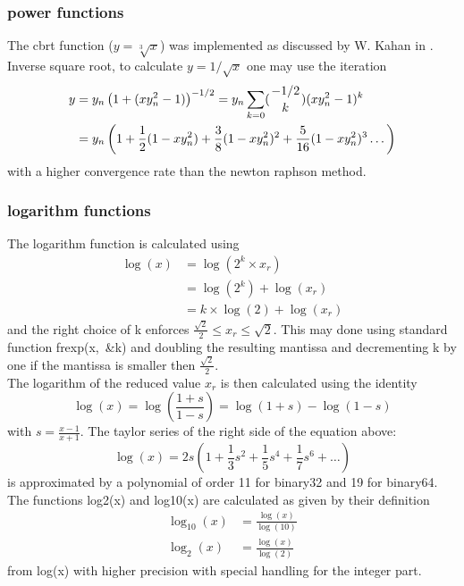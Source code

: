 \documentclass[10pt,a4paper,final,oneside]{article}
\numberwithin{equation}{subsection}
\begin{document}
%
%
\subsubsection{power functions}

The cbrt function ($ y=\sqrt[3]{x} $) was implemented as discussed by
W. Kahan in \cite{Kahan1991}.\\[10pt]
%
Inverse square root, to calculate $ y = 1/\sqrt{x} $ one may use the
iteration
\begin{equation}
    \begin{aligned}
        y &= y_n \left( 1+ ( x y_n^2 -1) \right)^{-1/2}
            = y_n \sum_{k=0} ({{-1/2}\atop{k}}) (x y_n^2 -1)^k \\
            & = y_n \left( 1 + \frac{1}{2} (1 - x y_n^2 ) +
            \frac{3}{8}(1- x y_n^2)^2 +
            \frac{5}{16} (1-x y_n^2)^3 \dots
            \right)
    \end{aligned}
\end{equation}
with a higher convergence rate than the newton raphson method.\\[10pt]
\subsubsection{logarithm functions}
%
The logarithm function is calculated using
\begin{equation}
    \begin{aligned}
        \log(x) &= \log(2^k \times x_r)  \\
                &= \log(2^k) + \log(x_r)  \\
                &= k \times \log(2) + \log(x_r)
  \end{aligned}
\end{equation}
and the right choice of k enforces
$ \frac{\sqrt{2}}{2} \le x_r \le \sqrt{2} $.
This may done using standard function \mbox{frexp(x, \&k)} and doubling
the resulting mantissa and decrementing k by one if the mantissa is
smaller then $\frac{\sqrt{2}}{2}$.\\[10pt]
%
The logarithm of the reduced value $x_r$ is then calculated using the
identity
\begin{equation}
  \log(x) = \log \left( \frac{1+s}{1-s} \right) = \log(1+s) - \log(1-s)
\end{equation}
with $  s= \frac{x-1}{x+1} $.
The taylor series of the right side of the equation above:
\begin{displaymath}
\log(x) = 2s
\left( 1 + \frac{1}{3} s^2 + \frac{1}{5} s^4 + \frac{1}{7} s^6 + \dots  \right)
\end{displaymath}
is approximated by a polynomial of order 11 for binary32 and 19 for binary64.
%
The functions log2(x) and log10(x) are calculated as given by their definition
\[
    \begin{aligned}
        \log_{10}(x) &= \frac{\log(x)}{\log(10)}\\
        \log_{2}(x) &= \frac{\log(x)}{\log(2)}
    \end{aligned}
\]
from log(x) with higher precision with special handling for the integer part.
\end{document}
